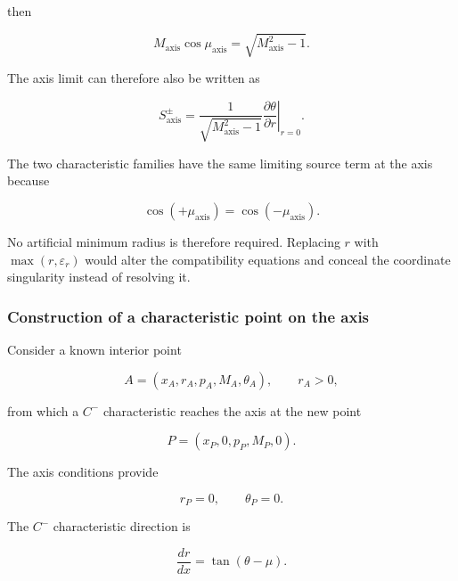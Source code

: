 then

\begin{equation}
M_{\mathrm{axis}}\cos\mu_{\mathrm{axis}}
=
\sqrt{M_{\mathrm{axis}}^2-1}.
\end{equation}

The axis limit can therefore also be written as

\begin{equation}
\boxed{
S^\pm_{\mathrm{axis}}
=
\frac{1}
{\sqrt{M_{\mathrm{axis}}^2-1}}
\left.
\frac{\partial\theta}{\partial r}
\right|_{r=0}
}.
\label{eq:S_axis_final}
\end{equation}

The two characteristic families have the same limiting source term at
the axis because

\begin{equation}
\cos(+\mu_{\mathrm{axis}})
=
\cos(-\mu_{\mathrm{axis}}).
\end{equation}

No artificial minimum radius is therefore required. Replacing \(r\)
with \(\max(r,\varepsilon_r)\) would alter the compatibility equations
and conceal the coordinate singularity instead of resolving it.

\subsubsection{Construction of a characteristic point on the axis}

Consider a known interior point

\begin{equation}
A=
\left(
x_A,r_A,p_A,M_A,\theta_A
\right),
\qquad r_A>0,
\end{equation}

from which a \(C^-\) characteristic reaches the axis at the new point

\begin{equation}
P=
\left(
x_P,0,p_P,M_P,0
\right).
\end{equation}

The axis conditions provide

\begin{equation}
\boxed{
r_P=0,
\qquad
\theta_P=0
}.
\label{eq:moc_axis_conditions}
\end{equation}

The \(C^-\) characteristic direction is

\begin{equation}
\frac{dr}{dx}
=
\tan(\theta-\mu).
\end{equation}

